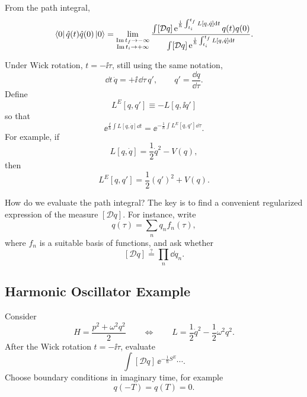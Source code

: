 \begin{center}
\end{center}

From the path integral,
\[
  \bra{0}\hat q(t)\hat q(0)\ket{0}
  =
  \lim_{\substack{\operatorname{Im}t_f\to-\infty\\
                  \operatorname{Im}t_i\to+\infty}}
  \frac{
  \int [\mathcal Dq]\,
  \mathrm{e}^{\frac{\mathrm{i}}{\hbar}\int_{t_i}^{t_f}L[q,\dot q]\mathrm{d} t}\,
  q(t)q(0)
  }{
  \int [\mathcal Dq]\,
  \mathrm{e}^{\frac{\mathrm{i}}{\hbar}\int_{t_i}^{t_f}L[q,\dot q]\mathrm{d} t}
  }.
\]

Under Wick rotation, $t=-\ii\tau$, still using the same notation,
\[
  \dd t\,\dot q=+\ii\,\dd\tau\,q',
  \qquad
  q'=\frac{\dd q}{\dd\tau}.
\]
Define
\[
  L^E[q,q']\equiv -L[q,\ii q']
\]
so that
\[
  \ee^{\frac{\ii}{\hbar}\int L[q,\dot q]\dd t}
  =
  \ee^{-\frac{1}{\hbar}\int L^E[q,q']\dd\tau}.
\]
For example, if
\[
  L[q,\dot q]=\frac12\dot q^2-V(q),
\]
then
\[
  L^E[q,q']=\frac12(q')^2+V(q).
\]

How do we evaluate the path integral? The key is to find a convenient
regularized expression of the measure $[\mathcal Dq]$. For instance, write
\[
  q(\tau)=\sum_n q_n f_n(\tau),
\]
where $f_n$ is a suitable basis of functions, and ask whether
\[
  [\mathcal Dq]\stackrel{?}{=}\prod_n\dd q_n.
\]

\subsection{Harmonic Oscillator Example}

Consider
\[
  H=\frac{p^2+\omega^2q^2}{2}
  \qquad\Longleftrightarrow\qquad
  L=\frac12\dot q^2-\frac12\omega^2q^2.
\]
After the Wick rotation $t=-\ii\tau$, evaluate
\[
  \int[\mathcal Dq]\,\ee^{-\frac{1}{\hbar}S^E}\cdots.
\]
Choose boundary conditions in imaginary time, for example
\[
  q(-T)=q(T)=0.
\]

\begin{center}
\end{center}

